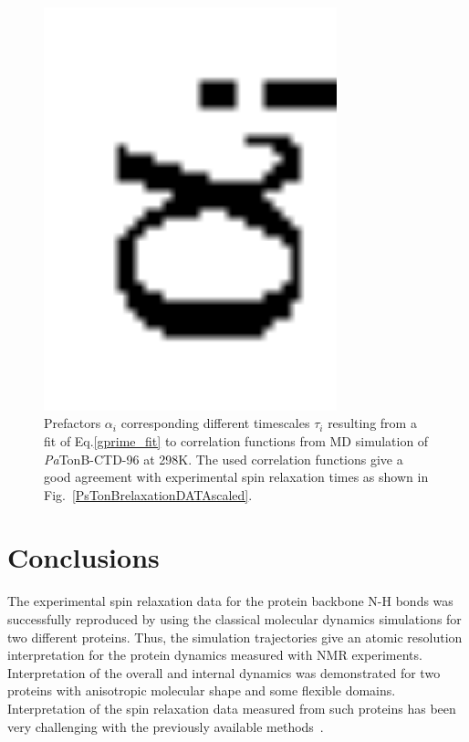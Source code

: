 \documentclass[journal=jpcbfk,manuscript=article]{achemso}
\begin{document}
\begin{figure}[!h]
  \includegraphics[width=8.5cm]{../Figs/coeffsPLOT.eps}%
  \caption{Prefactors $\alpha_i$ corresponding different timescales $\tau_i$
    resulting from a fit of Eq.\ref{gprime_fit} to correlation functions from
    MD simulation of {\it Pa}TonB-CTD-96 at 298K. The used correlation functions give
    a good agreement with experimental spin relaxation times as shown in
    Fig.~\ref{PsTonBrelaxationDATAscaled}.  \label{coeffsPLOT}}%
\end{figure}


\section{Conclusions}
The experimental spin relaxation data for the protein backbone N-H bonds
was successfully reproduced by using the classical molecular dynamics
simulations for two different proteins.
Thus, the simulation trajectories give an atomic resolution
interpretation for the protein dynamics measured with NMR experiments.
Interpretation of the overall and internal dynamics was demonstrated for
two proteins with anisotropic molecular shape and some flexible domains. 
Interpretation of the spin relaxation data measured from
such proteins has been very challenging with the previously available
methods~\cite{barbato92,luginbuhl97}.
\end{document}

